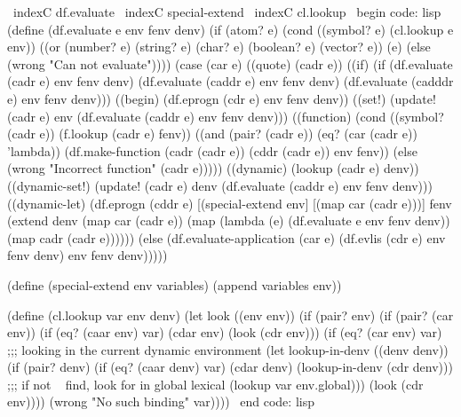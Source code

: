 \ indexC {df.evaluate}
\ indexC {special-extend}
\ indexC {cl.lookup}
\ begin {code: lisp}
(define (df.evaluate e env fenv denv)
  (if (atom? e)
      (cond ((symbol? e) (cl.lookup e env))
            ((or (number? e) (string? e) (char? e)
                 (boolean? e) (vector? e))
             (e)
            (else (wrong "Can not evaluate"))))
      (case (car e)
        ((quote) (cadr e))
        ((if) (if (df.evaluate (cadr e) env fenv denv)
                      (df.evaluate (caddr e) env fenv denv)
                      (df.evaluate (cadddr e) env fenv denv)))
        ((begin) (df.eprogn (cdr e) env fenv denv))
        ((set!) (update! (cadr e)
                           env
                           (df.evaluate (caddr e) env fenv denv)))
        ((function)
         (cond ((symbol? (cadr e))
                (f.lookup (cadr e) fenv))
               ((and (pair? (cadr e)) (eq? (car (cadr e)) 'lambda))
                (df.make-function
                 (cadr (cadr e)) (cddr (cadr e)) env fenv))
               (else (wrong "Incorrect function" (cadr e)))))
        ((dynamic) (lookup (cadr e) denv))
        ((dynamic-set!)
         (update! (cadr e)
                  denv
                  (df.evaluate (caddr e) env fenv denv)))
        ((dynamic-let)
         (df.eprogn (cddr e)
                    [(special-extend env]
                                    [(map car (cadr e)))]
                    fenv
                    (extend denv
                            (map car (cadr e))
                            (map (lambda (e)
                                   (df.evaluate e env fenv denv))
                                 (map cadr (cadr e))))))
        (else (df.evaluate-application (car e)
                                       (df.evlis (cdr e) env fenv denv)
                                       env
                                       fenv
                                       denv)))))

(define (special-extend env variables)
  (append variables env))

(define (cl.lookup var env denv)
  (let look ((env env))
    (if (pair? env)
        (if (pair? (car env))
            (if (eq? (caar env) var)
                (cdar env)
                (look (cdr env)))
            (if (eq? (car env) var)
                ;;; looking in the current dynamic environment
                (let lookup-in-denv ((denv denv))
                  (if (pair? denv)
                      (if (eq? (caar denv) var)
                          (cdar denv)
                          (lookup-in-denv (cdr denv)))
                      ;;; if not ~ find, look for in global lexical
                      (lookup var env.global)))
                (look (cdr env))))
        (wrong "No such binding" var))))
\ end {code: lisp}


